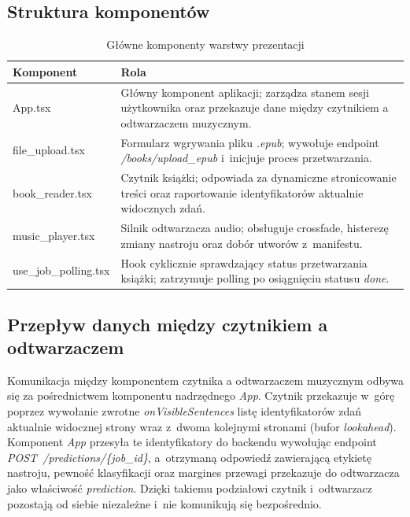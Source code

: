 \subsection{Struktura komponentów}
\begin{table}[htbp]
    \centering
    \caption{Główne komponenty warstwy prezentacji}
    \label{tab:frontend_components}
    \begin{tabular}{l p{9cm}}
        \toprule
        Komponent & Rola \\
        \midrule
        App.tsx            & Główny komponent aplikacji; zarządza stanem sesji 
                                        użytkownika oraz przekazuje dane między czytnikiem 
                                        a odtwarzaczem muzycznym. \\
        file\_upload.tsx    & Formularz wgrywania pliku \textit{.epub}; 
                                        wywołuje endpoint \textit{/books/upload\_epub} 
                                        i~inicjuje proces przetwarzania. \\
        book\_reader.tsx    & Czytnik książki; odpowiada za dynamiczne 
                                        stronicowanie treści oraz raportowanie 
                                        identyfikatorów aktualnie widocznych zdań. \\
        music\_player.tsx   & Silnik odtwarzacza audio; obsługuje crossfade, 
                                        histerezę zmiany nastroju oraz dobór 
                                        utworów z~manifestu. \\
        use\_job\_polling.tsx & Hook cyklicznie sprawdzający status 
                                        przetwarzania książki; zatrzymuje polling 
                                        po osiągnięciu statusu \textit{done}. \\
        \bottomrule
    \end{tabular}
\end{table}

\FloatBarrier
\subsection{Przepływ danych między czytnikiem a odtwarzaczem}
Komunikacja między komponentem czytnika a odtwarzaczem muzycznym odbywa się 
za pośrednictwem komponentu nadrzędnego \textit{App}. Czytnik przekazuje 
w~górę poprzez wywołanie zwrotne \textit{onVisibleSentences} listę 
identyfikatorów zdań aktualnie widocznej strony wraz z~dwoma kolejnymi 
stronami (bufor \textit{lookahead}). Komponent \textit{App} przesyła te 
identyfikatory do backendu wywołując endpoint 
\textit{POST~\allowbreak/predictions/\{job\_id\}}, a~otrzymaną odpowiedź 
 zawierającą etykietę nastroju, pewność klasyfikacji oraz margines 
przewagi przekazuje do odtwarzacza jako właściwość \textit{prediction}. 
Dzięki takiemu podziałowi czytnik i~odtwarzacz pozostają od siebie niezależne 
i~nie komunikują się bezpośrednio.


